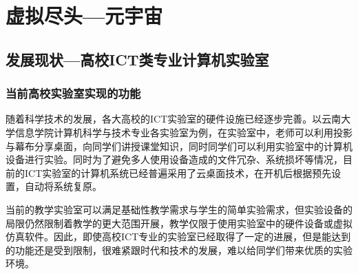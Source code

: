 \documentclass{imutthesis}
\begin{document}
\tableofcontents    %
\newpage 
{}
\setcounter{page}{1}
\section{虚拟尽头—元宇宙}
\subsection{发展现状—高校ICT类专业计算机实验室}
\subsubsection{当前高校实验室实现的功能}
随着科学技术的发展，各大高校的ICT实验室的硬件设施已经逐步完善。以云南大学信息学院计算机科学与技术专业各实验室为例，在实验室中，老师可以利用投影与幕布分享桌面，向同学们讲授课堂知识，同时同学们可以利用实验室中的计算机设备进行实验。同时为了避免多人使用设备造成的文件冗杂、系统损坏等情况，目前的ICT实验室的计算机系统已经普遍采用了云桌面技术，在开机后根据预先设置，自动将系统复原。

当前的教学实验室可以满足基础性教学需求与学生的简单实验需求，但实验设备的局限仍然限制着教学的更大范围开展，教学仅限于使用实验室中的硬件设备或虚拟仿真软件。因此，即使高校ICT专业的实验室已经取得了一定的进展，但是能达到的功能还是受到限制，很难紧跟时代和技术的发展，难以给同学们带来优质的实验环境。
\end{document}
